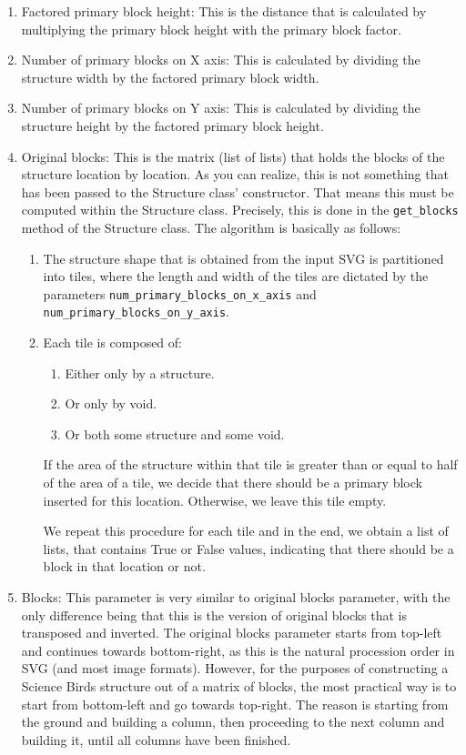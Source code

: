 \documentclass{dalthesis}
\begin{document}
\begin{enumerate}
\begin{enumerate}
    \item Factored primary block height: This is the distance that is calculated by multiplying the primary block height with the primary block factor.
    \item Number of primary blocks on X axis: This is calculated by dividing the structure width by the factored primary block width.
    \item Number of primary blocks on Y axis: This is calculated by dividing the structure height by the factored primary block height.
    \item Original blocks: This is the matrix (list of lists) that holds the blocks of the structure location by location. As you can realize, this is not something that has been passed to the Structure class' constructor. That means this must be computed within the Structure class. Precisely, this is done in the \lstinline{get_blocks} method of the Structure class. The algorithm is basically as follows:

    \begin{enumerate}
      \item The structure shape that is obtained from the input SVG is partitioned into tiles, where the length and width of the tiles are dictated by the parameters \lstinline{num_primary_blocks_on_x_axis} and \lstinline{num_primary_blocks_on_y_axis}.
      \item Each tile is composed of:

      \begin{enumerate}
        \item Either only by a structure.
        \item Or only by void.
        \item Or both some structure and some void.
      \end{enumerate}

      If the area of the structure within that tile is greater than or equal to half of the area of a tile, we decide that there should be a primary block inserted for this location. Otherwise, we leave this tile empty.

      We repeat this procedure for each tile and in the end, we obtain a list of lists, that contains True or False values, indicating that there should be a block in that location or not.
    \end{enumerate}

    \item Blocks: This parameter is very similar to original blocks parameter, with the only difference being that this is the version of original blocks that is transposed and inverted. The original blocks parameter starts from top-left and continues towards bottom-right, as this is the natural procession order in SVG (and most image formats). However, for the purposes of constructing a Science Birds structure out of a matrix of blocks, the most practical way is to start from bottom-left and go towards top-right. The reason is starting from the ground and building a column, then proceeding to the next column and building it, until all columns have been finished.


\end{enumerate}
\end{enumerate}
\end{document}
